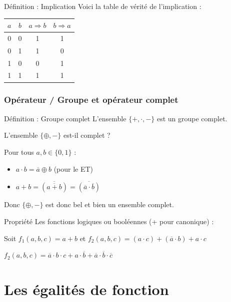 \documentclass[a4paper,12pt]{article}
\begin{document}
\begin{defbox}{Définition : Implication}
Voici la table de vérité de l'implication :

\vspace{0.3cm}
\begin{center}
\begin{tabular}{|c|c|c|c|}
\hline
$a$ & $b$ & $a \Rightarrow b$ & $b \Rightarrow a$ \\
\hline
0 & 0 & 1 & 1 \\
\hline
0 & 1 & 1 & 0 \\
\hline
1 & 0 & 0 & 1 \\
\hline
1 & 1 & 1 & 1 \\
\hline
\end{tabular}
\end{center}
\end{defbox}

\subsubsection{Opérateur / Groupe et opérateur complet}

\begin{defbox}{Définition : Groupe complet}
L'ensemble $\{+, \cdot, -\}$ est un groupe complet.

L'ensemble $\{\oplus, -\}$ est-il complet ?

\vspace{0.3cm}
Pour tous $a, b \in \{0,1\}$ :
\begin{itemize}
    \item $a \cdot b = \overline{a} \oplus b$ (pour le ET)
    \item $a + b = \overline{(\overline{a + b})} = \overline{(\overline{a} \cdot \overline{b})}$
\end{itemize}

Donc $\{\oplus, -\}$ est donc bel et bien un ensemble complet.
\end{defbox}

\begin{propbox}{Propriété}
Les fonctions logiques ou booléennes (+ pour canonique) :

Soit $f_1(a,b,c) = a + b$ et $f_2(a,b,c) = (a \cdot c) + (\overline{a} \cdot b) + a \cdot c$

$f_2(a,b,c) = \overline{a} \cdot b \cdot c + a \cdot \overline{b} + \overline{a} \cdot \overline{b} \cdot \overline{c}$
\end{propbox}

\newpage
\section{Les égalités de fonction}
\end{document}
